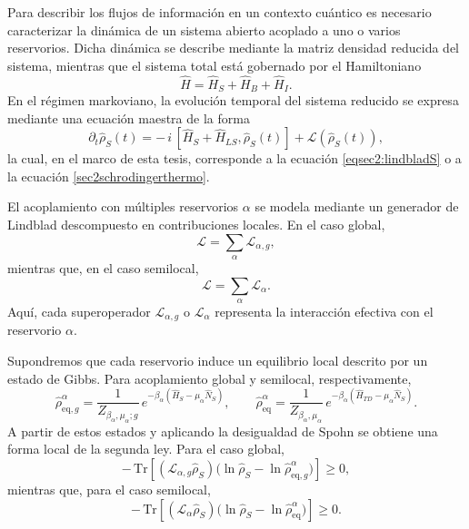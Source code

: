 Para describir los flujos de información en un contexto cuántico es necesario caracterizar la dinámica de un sistema abierto acoplado a uno o varios reservorios. Dicha dinámica se describe mediante la matriz densidad reducida del sistema, mientras que el sistema total está gobernado por el Hamiltoniano
\[
\hat{H}=\hat{H}_{S}+\hat{H}_{B}+\hat{H}_{I}.
\]
En el régimen markoviano, la evolución temporal del sistema reducido se expresa mediante una ecuación maestra de la forma
\begin{equation*}
    \partial_{t}\hat{\rho}_{S}(t)
    = -\,i\,[\hat{H}_{S}+\hat{H}_{LS},\hat{\rho}_{S}(t)]
      + \mathcal{L}(\hat{\rho}_{S}(t)),
\end{equation*}
la cual, en el marco de esta tesis, corresponde a la ecuación \eqref{eqsec2:lindbladS} o a la ecuación \eqref{sec2schrodingerthermo}.

El acoplamiento con múltiples reservorios $\alpha$ se modela mediante un generador de Lindblad descompuesto en contribuciones locales. En el caso global,
\begin{equation*}
    \mathcal{L}=\sum_{\alpha}\mathcal{L}_{\alpha,g},
\end{equation*}
mientras que, en el caso semilocal,
\begin{equation*}
    \mathcal{L}=\sum_{\alpha}\mathcal{L}_{\alpha}.
\end{equation*}
Aquí, cada superoperador $\mathcal{L}_{\alpha,g}$ o $\mathcal{L}_{\alpha}$ representa la interacción efectiva con el reservorio $\alpha$.

Supondremos que cada reservorio induce un equilibrio local descrito por un estado de Gibbs. Para acoplamiento global y semilocal, respectivamente,
\[
\hat{\rho}_{\mathrm{eq},g}^{\alpha}
=\frac{1}{Z_{\beta_{\alpha},\mu_{\alpha};g}}
\,e^{-\beta_{\alpha}(\hat{H}_{S}-\mu_{\alpha}\hat{N}_{S})},
\qquad
\hat{\rho}_{\mathrm{eq}}^{\alpha}
=\frac{1}{Z_{\beta_{\alpha},\mu_{\alpha}}}
\,e^{-\beta_{\alpha}(\hat{H}_{TD}-\mu_{\alpha}\hat{N}_{S})}.
\]
A partir de estos estados y aplicando la desigualdad de Spohn \cite{spohn1978entropy} se obtiene una forma local de la segunda ley. Para el caso global,
\begin{equation}
    -\,\mathrm{Tr}\!\left[(\mathcal{L}_{\alpha,g}\hat{\rho}_{S})
      \big(\ln\hat{\rho}_{S}-\ln\hat{\rho}_{\mathrm{eq},g}^{\alpha}\big)\right]\ge 0,
    \label{spohninfo}
\end{equation}
mientras que, para el caso semilocal,
\begin{equation}
    -\,\mathrm{Tr}\!\left[(\mathcal{L}_{\alpha}\hat{\rho}_{S})
      \big(\ln\hat{\rho}_{S}-\ln\hat{\rho}_{\mathrm{eq}}^{\alpha}\big)\right]\ge 0.
    \label{spohninfolocal}
\end{equation}

